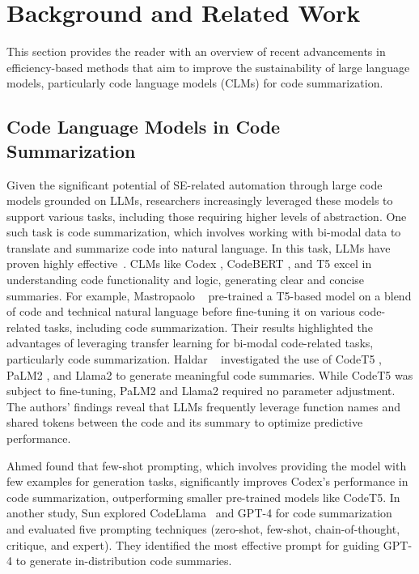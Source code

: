 \section{Background and Related Work}
\label{sec:related}


This section provides the reader with an overview of recent advancements in efficiency-based methods that aim to improve the sustainability of large language models, particularly code language models (CLMs) for code summarization.

\subsection{Code Language Models in Code Summarization} 
\label{sec:CLM}



Given the significant potential of SE-related automation through large code models grounded on LLMs, researchers increasingly leveraged these models to support various tasks, including those requiring higher levels of abstraction. One such task is code summarization, which involves working with bi-modal data to translate and summarize code into natural language. In this task, LLMs have proven highly effective~\cite{sun2024extractive,shi2022evaluation,fang2024esale,ahmad2020transformer,mastropaolo2022using}. CLMs like Codex \cite{ahmed2023improving,arakelyan2023exploring}, CodeBERT \cite{chen2022transferability, gu2022assemble}, and T5 \cite{mastropaolo2022using} excel in understanding code functionality and logic, generating clear and concise summaries. For example, Mastropaolo \etal~\cite{mastropaolo2022using} pre-trained a T5-based model on a blend of code and technical natural language before fine-tuning it on various code-related tasks, including code summarization. Their results highlighted the advantages of leveraging transfer learning for bi-modal code-related tasks, particularly code summarization. Haldar \etal~\cite{haldar2024analyzing} investigated the use of CodeT5 \cite{wang2021codet5}, PaLM2 \cite{anil2023palm}, and Llama2 \cite{touvron2023llama} to generate meaningful code summaries. While CodeT5 was subject to fine-tuning, PaLM2 and Llama2 required no parameter adjustment. The authors' findings reveal that LLMs frequently leverage function names and shared tokens between the code and its summary to optimize predictive performance.

Ahmed \etal \cite{ahmed2022few} found that few-shot prompting, which involves providing the model with few examples for generation tasks, significantly improves Codex's performance in code summarization, outperforming smaller pre-trained models like CodeT5. In another study,  Sun \etal \cite{sun2023automatic} explored CodeLlama~\cite{codellama2} and GPT-4 \cite{achiam2023gpt} for code summarization and evaluated five prompting techniques (\ie zero-shot, few-shot, chain-of-thought, critique, and expert). They identified the most effective prompt for guiding  GPT-4  to generate in-distribution code summaries.



